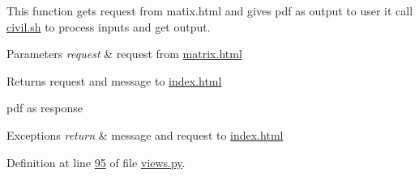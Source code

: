 This function gets request from matix.\+html and gives pdf as output to user it call \hyperlink{civil_8sh}{civil.\+sh} to process inputs and get output. 


\begin{DoxyParams}{Parameters}
{\em request} & request from \hyperlink{matrix_8html}{matrix.\+html} \\
\hline
\end{DoxyParams}
\begin{DoxyReturn}{Returns}
request and message to \hyperlink{index_8html}{index.\+html} 

pdf as response 
\end{DoxyReturn}

\begin{DoxyExceptions}{Exceptions}
{\em return} & message and request to \hyperlink{index_8html}{index.\+html} \\
\hline
\end{DoxyExceptions}


Definition at line \hyperlink{views_8py_source_l00095}{95} of file \hyperlink{views_8py_source}{views.\+py}.


